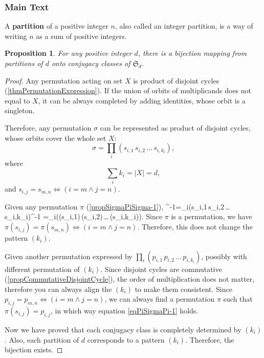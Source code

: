 \documentclass[12pt, letterpaper]{article}
\newcommand{\card}[1]{\left\lvert #1 \right\rvert}
\newenvironment{eqlong}{\equation\aligned}{\endaligned\endequation}
\newtheorem{prop}{Proposition}[section]
\theoremstyle{definition}
\theoremstyle{remark}
\theoremstyle{definition}
\theoremstyle{plain}
\numberwithin{equation}{section}
\begin{document}
	\subsubsection{Main Text}
	\begin{def*}[partition]
		A \textbf{partition} of a positive integer $n$, also called an integer partition, is a way of writing $n$ as a sum of positive integers.
	\end{def*}
	\begin{prop}
		For any positive integer $d$,
		there is a bijection mapping from partitions of $d$ onto conjugacy classes of $\mathfrak{S}_d$.
	\end{prop}
	\begin{proof}
		Any permutation acting on set $X$ is product of disjoint cycles (\ref{thmPermutationExpression}).
		If the union of orbits of multiplicands does not equal to $X$,
		it can be always completed by adding identities, whose orbit is a singleton.
		
		Therefore, any permutation $\sigma$ can be represented as product of disjoint cycles,
		whose orbits cover the whole set $X$:
		\[\sigma=\prod_i(s_{i,1}\,s_{i,2}\,\dots\,s_{i,k_i}),\]
		where
		\[\sum_{i}k_i=\card{X}=d,\]
		and $s_{i,j}= s_{m,n}\iff (i=m\land j=n)$.
		
		Given any permutation $\pi$ (\ref{propSigmaPiSigma-1}),
		\begin{eqlong}\label{eqPiSigmaPi-1}
			\pi\circ\sigma\circ\pi^{-1}=\prod_i\pi\circ(s_{i,1}\,s_{i,2}\,\dots\,s_{i,k_i})\circ\pi^{-1}
			=\prod_i(\pi(s_{i,1})\,\pi(s_{i,2})\,\dots\,\pi(s_{i,k_i})).
		\end{eqlong}
		Since $\pi$ is a permutation,
		we have $\pi(s_{i,j})= \pi(s_{m,n})\iff (i=m\land j=n)$.
		Therefore, this does not change the pattern $(k_i)$.
		
		Given another permutation expressed by $\prod_i(p_{i,1}\,p_{i,2}\,\dots\,p_{i,k_i})$,
		possibly with different permutation of $(k_i)$.
		Since disjoint cycles are commutative (\ref{propCommutativeDisjointCycle}),
		the order of multiplication does not matter,
		therefore you can always align the $(k_i)$ to make them consistent.
		Since $p_{i,j}= p_{m,n}\iff (i=m\land j=n)$, we can always find a permutation $\pi$
		such that $\pi(s_{i,j})=p_{i,j}$, in which way equation \eqref{eqPiSigmaPi-1} holds.
		
		Now we have proved that each conjugacy class is completely determined by $(k_i)$.
		Also, each partition of $d$ corresponds to a pattern $(k_i)$.
		Therefore, the bijection exists.		
	\end{proof}
\end{document}
